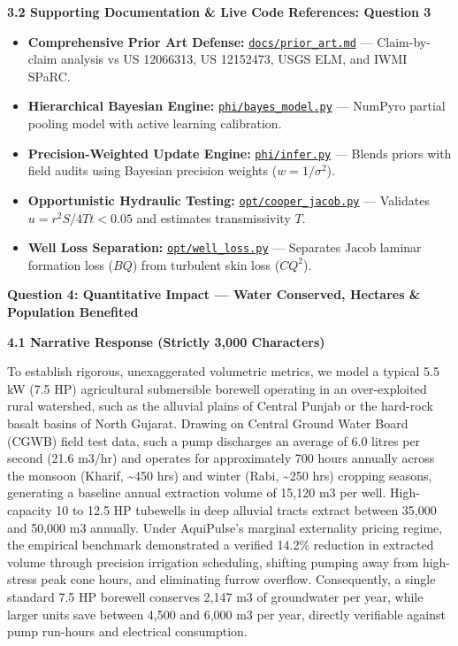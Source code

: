 \documentclass[10pt,a4paper]{article}
\begin{document}
{\small \textbf{\color{secondary}3.2 Supporting Documentation \& Live Code References: Question 3}}
\begin{itemize}[leftmargin=1.5em, itemsep=1pt]
    \item \textbf{Comprehensive Prior Art Defense:} \href{https://github.com/HirthikBalaji/AquiPulse/blob/main/docs/prior_art.md}{\texttt{docs/prior\_art.md}} --- Claim-by-claim analysis vs US 12066313, US 12152473, USGS ELM, and IWMI SPaRC.
    \item \textbf{Hierarchical Bayesian Engine:} \href{https://github.com/HirthikBalaji/AquiPulse/blob/main/phi/bayes_model.py}{\texttt{phi/bayes\_model.py}} --- NumPyro partial pooling model with active learning calibration.
    \item \textbf{Precision-Weighted Update Engine:} \href{https://github.com/HirthikBalaji/AquiPulse/blob/main/phi/infer.py}{\texttt{phi/infer.py}} --- Blends priors with field audits using Bayesian precision weights ($w = 1/\sigma^2$).
    \item \textbf{Opportunistic Hydraulic Testing:} \href{https://github.com/HirthikBalaji/AquiPulse/blob/main/opt/cooper_jacob.py}{\texttt{opt/cooper\_jacob.py}} --- Validates $u = r^2 S / 4Tt < 0.05$ and estimates transmissivity $T$.
    \item \textbf{Well Loss Separation:} \href{https://github.com/HirthikBalaji/AquiPulse/blob/main/opt/well_loss.py}{\texttt{opt/well\_loss.py}} --- Separates Jacob laminar formation loss ($BQ$) from turbulent skin loss ($CQ^2$).
\end{itemize}

\newpage

{\large \textbf{\color{primary}Question 4: Quantitative Impact --- Water Conserved, Hectares \& Population Benefited}}
\vspace{0.1em}

{\small \textbf{\color{secondary}4.1 Narrative Response (Strictly 3,000 Characters)}}

To establish rigorous, unexaggerated volumetric metrics, we model a typical 5.5 kW (7.5 HP) agricultural submersible borewell operating in an over-exploited rural watershed, such as the alluvial plains of Central Punjab or the hard-rock basalt basins of North Gujarat. Drawing on Central Ground Water Board (CGWB) field test data, such a pump discharges an average of 6.0 litres per second (21.6 m3/hr) and operates for approximately 700 hours annually across the monsoon (Kharif, \~{}450 hrs) and winter (Rabi, \~{}250 hrs) cropping seasons, generating a baseline annual extraction volume of 15,120 m3 per well. High-capacity 10 to 12.5 HP tubewells in deep alluvial tracts extract between 35,000 and 50,000 m3 annually. Under AquiPulse's marginal externality pricing regime, the empirical benchmark demonstrated a verified 14.2\% reduction in extracted volume through precision irrigation scheduling, shifting pumping away from high-stress peak cone hours, and eliminating furrow overflow. Consequently, a single standard 7.5 HP borewell conserves 2,147 m3 of groundwater per year, while larger units save between 4,500 and 6,000 m3 per year, directly verifiable against pump run-hours and electrical consumption.
\end{document}
